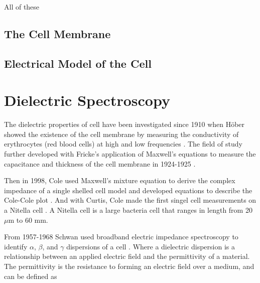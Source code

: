  \par All of these 
 
 \subsection{The Cell Membrane}
 
 
 \subsection{Electrical Model of the Cell}
 
 
 \section{Dielectric Spectroscopy}
 
 
 \par The dielectric properties of cell have been investigated since 1910 when H\"{o}ber showed the existence of the cell membrane by measuring the conductivity of erythrocytes (red blood cells) at high and low frequencies \cite{hober_r_methode_1910}. The field of study further developed with Fricke's application of Maxwell's equations to measure the capacitance and thickness of the cell membrane in 1924-1925 \cite{james_clerk_maxwell_treatise_1892, fricke_h_mathematical_1924, fricke_h_electric_1924, fricke_h_electric_1931}. 
 
 \par Then in 1998, Cole used Maxwell's mixture equation to derive the complex impedance of a single shelled cell model and developed equations to describe the Cole-Cole plot \cite{cole_electric_1928}. And with Curtis, Cole made the first singel cell measurements on a Nitella cell \cite{curtis_transverse_1937}. A Nitella cell is a large bacteria cell that ranges in length from 20 $\mu$m to 60 mm. 
 
 \par From 1957-1968 Schwan used broadband electric impedance spectroscopy to identify $\alpha$, $\beta$, and $\gamma$ dispersions of a cell \cite{schwan_h_p_electrical_1957,schwan_h_p_electrical_1963,schwan_electrical_1994}. Where a dielectric dispersion is a relationship between an applied electric field and the permittivity of a material. The permittivity is the resistance to forming an electric field over a medium, and can be defined as
 
